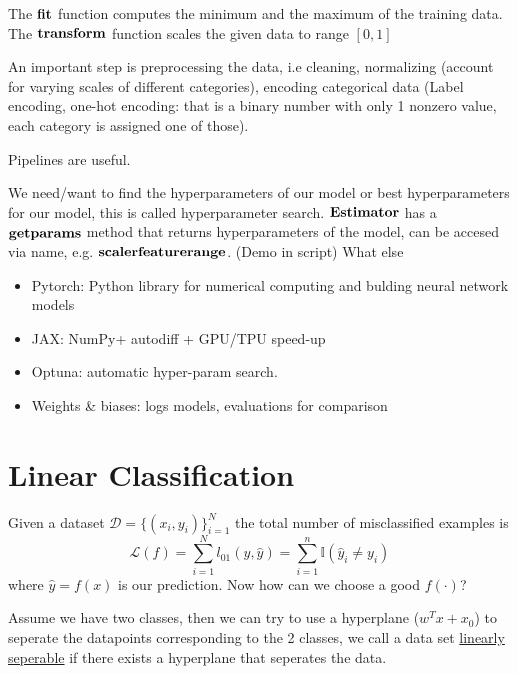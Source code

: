 \documentclass[12 pt]{article}        	%
\begin{document}
The $\bold{fit}$ function computes the minimum and the maximum of the training data.
The $\bold{transform}$ function scales the given data to range $ [ 0 , 1 ] $

An important step is preprocessing the data, i.e cleaning, normalizing (account for varying scales of different categories), encoding categorical data (Label encoding, one-hot encoding: that is a binary number with only 1 nonzero value, each category is assigned one of those).

Pipelines are useful.

We need/want to find the hyperparameters of our model or best hyperparameters for our model, this is called hyperparameter search.
$\bold{Estimator}$ has a $\bold{get params}$ method that returns hyperparameters of the model, can be accesed via name, e.g. $\bold{scaler feature range}$. (Demo in script)
What else
\begin{itemize}
    \item 
    Pytorch: Python library for numerical computing and bulding neural network models

    \item 
    JAX: NumPy+ autodiff + GPU/TPU speed-up

    \item 
    Optuna: automatic hyper-param search.

    \item 
    Weights \& biases: logs models, evaluations for comparison
\end{itemize}

\section{Linear Classification}

Given a dataset $ \mathcal{ D } = \{ ( x_i , y_i ) \}_{ i = 1 }^N $ the total number of misclassified examples is 
\[
    \mathcal{ L } ( f )  = \sum_{ i = 1 }^N l_{ 0 1 } ( y , \hat{ y } ) 
    =
    \sum_{ i = 1 }^n \mathbb{ I } ( \hat{ y }_i \neq y_i ) 
\]
where $ \hat{ y } = f ( x ) $ is our prediction. 
Now how can we choose a good $ f ( \cdot ) $?

Assume we have two classes, then we can try to use a hyperplane ($ w^T x + x_0 $) to seperate the datapoints corresponding to the 2 classes,
we call a data set \underline{linearly seperable} if there exists a hyperplane that seperates the data.
\end{document}
